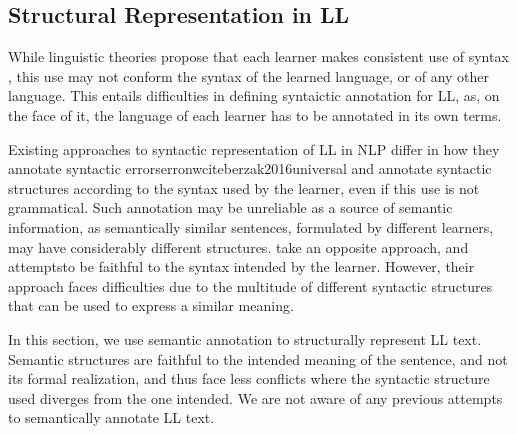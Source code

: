 \documentclass[letter,11pt]{article}
\begin{document}
{%

\subsection{Structural Representation in LL}

While linguistic theories propose that each learner
makes consistent use of syntax \cite{huebner1985system,tarone1983variability},
this use may not conform the 
syntax of the learned language, or of any other
language. This entails difficulties in defining syntaictic annotation for LL,
as, on the face of it, the language of each learner has to be annotated
in its own terms.

Existing approaches to syntactic representation of LL in NLP
differ in how they annotate syntactic errorserronwcite{berzak2016universal} and 
annotate syntactic structures according to the syntax used
by the learner, even if this use is not grammatical.
Such annotation may be unreliable as a source of semantic information,
as semantically similar sentences, formulated by different learners,
may have considerably different structures.  take an opposite approach, and attemptsto be faithful to the syntax intended by the learner. However, their
approach faces difficulties due to the multitude of different syntactic
structures that can be used to express a similar meaning.


In this section, we use semantic annotation to structurally
represent LL text. Semantic structures are faithful to the intended
meaning of the sentence, and not its formal realization, and thus face
less conflicts where the syntactic structure used diverges from
the one intended. We are not aware of any previous attempts to semantically
annotate LL text.


}
\end{document}
